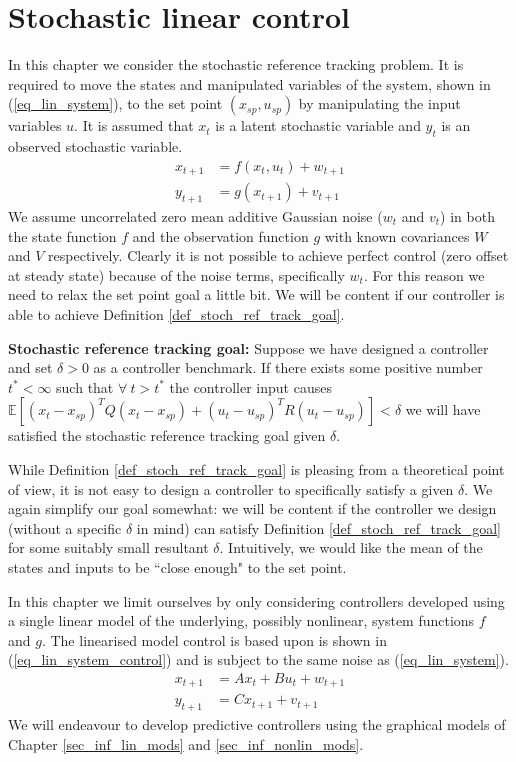 \chapter{Stochastic linear control}
\label{sec_linear_control}
In this chapter we consider the stochastic reference tracking problem. It is required to move the states and manipulated variables of the system, shown in (\ref{eq_lin_system}), to the set point $(x_{sp}, u_{sp})$ by manipulating the input variables $u$. It is assumed that $x_t$ is a latent stochastic variable and $y_t$ is an observed stochastic variable.
\begin{equation}
\begin{aligned}
x_{t+1} &= f(x_t, u_t) + w_{t+1}  \\
y_{t+1} &= g(x_{t+1}) + v_{t+1}  
\end{aligned}
\label{eq_lin_system}
\end{equation}
We assume uncorrelated zero mean additive Gaussian noise ($w_t$ and $v_t$) in both the state function $f$ and the observation function $g$ with known covariances $W$ and $V$ respectively. Clearly it is not possible to achieve perfect control (zero offset at steady state) because of the noise terms, specifically $w_t$. For this reason we need to relax the set point goal a little bit. We will be content if our controller is able to achieve Definition \ref{def_stoch_ref_track_goal}.
\begin{defn}
\textbf{Stochastic reference tracking goal:} Suppose we have designed a controller and set $\delta > 0$ as a controller benchmark. If there exists some positive number $t^* < \infty$ such that $\forall~t > t^*$ the controller input causes $\mathbb{E}[(x_t-x_{sp})^TQ(x_t-x_{sp}) + (u_t-u_{sp})^TR(u_t-u_{sp})] < \delta$ we will have satisfied the stochastic reference tracking goal given $\delta$.
\label{def_stoch_ref_track_goal}
\end{defn}
While Definition \ref{def_stoch_ref_track_goal} is pleasing from a theoretical point of view, it is not easy to design a controller to specifically satisfy a given $\delta$. We again simplify our goal somewhat: we will be content if the controller we design (without a specific $\delta$ in mind) can satisfy Definition \ref{def_stoch_ref_track_goal} for some suitably small resultant  $\delta$. Intuitively, we would like the mean of the states and inputs to be ``close enough" to the set point. 

In this chapter we limit ourselves by only considering controllers developed using a single linear model of the underlying, possibly nonlinear, system functions $f$ and $g$. The linearised model control is based upon is shown in (\ref{eq_lin_system_control}) and is subject to the same noise as (\ref{eq_lin_system}).
\begin{equation}
\begin{aligned}
x_{t+1} &= Ax_t + Bu_t + w_{t+1} \\
y_{t+1} &= Cx_{t+1} + v_{t+1} 
\end{aligned}
\label{eq_lin_system_control}
\end{equation}
We will endeavour to develop predictive controllers using the graphical models of Chapter \ref{sec_inf_lin_mods} and \ref{sec_inf_nonlin_mods}.

